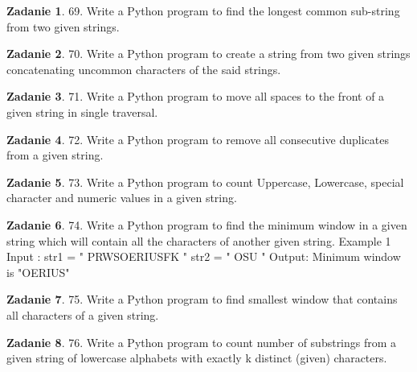 \documentclass[11pt]{article}
\theoremstyle{definition}
\newtheorem{zadanie}{Zadanie}
\begin{document}
\begin{zadanie}


69. Write a Python program to find the longest common sub-string from two given strings. 

\end{zadanie}

\begin{zadanie}


70. Write a Python program to create a string from two given strings concatenating uncommon characters of the said strings. 

\end{zadanie}

\begin{zadanie}


71. Write a Python program to move all spaces to the front of a given string in single traversal. 

\end{zadanie}

\begin{zadanie}


72. Write a Python program to remove all consecutive duplicates from a given string. 

\end{zadanie}

\begin{zadanie}


73. Write a Python program to count Uppercase, Lowercase, special character and numeric values in a given string. 

\end{zadanie}

\begin{zadanie}


74. Write a Python program to find the minimum window in a given string which will contain all the characters of another given string. 
Example 1
Input : str1 = " PRWSOERIUSFK "
str2 = " OSU "
Output: Minimum window is "OERIUS"

\end{zadanie}

\begin{zadanie}


75. Write a Python program to find smallest window that contains all characters of a given string. 

\end{zadanie}

\begin{zadanie}


76. Write a Python program to count number of substrings from a given string of lowercase alphabets with exactly k distinct (given) characters. 

\end{zadanie}
\end{document}

